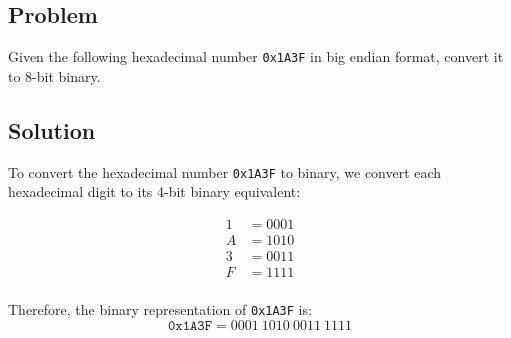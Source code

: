 \subsection*{Problem}
Given the following hexadecimal number \texttt{0x1A3F} in big endian format, convert it to 8-bit binary.

\subsection*{Solution}
To convert the hexadecimal number \texttt{0x1A3F} to binary, we convert each hexadecimal digit to its 4-bit binary equivalent:

\begin{align*}
1 & = 0001 \\
A & = 1010 \\
3 & = 0011 \\
F & = 1111 \\
\end{align*}

Therefore, the binary representation of \texttt{0x1A3F} is:
\[
\texttt{0x1A3F} = 0001\ 1010\ 0011\ 1111
\]